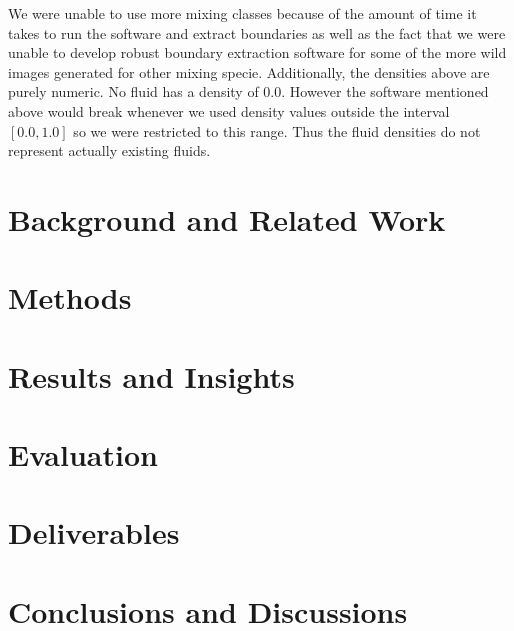 \documentclass[12pt, fullpage,letterpaper]{article}
\begin{document}
	We were unable to use more mixing classes because of the amount of time it takes to run the software and extract boundaries as well as the fact that we were unable to develop robust boundary extraction software for some of the more wild images generated for other mixing specie. Additionally, the densities above are purely numeric. No fluid has a density of 0.0. However the software mentioned above would break whenever we used density values outside the interval $[0.0, 1.0]$ so we were restricted to this range. Thus the fluid densities do not represent actually existing fluids. 
	
	\section*{\normalfont Background and Related Work}
	 
	
	\section*{\normalfont Methods}
	\section*{\normalfont Results and Insights}
	\section*{\normalfont Evaluation}
	\section*{\normalfont Deliverables}
	\section*{\normalfont Conclusions and Discussions}
	
%	
	
\end{document}
